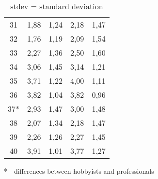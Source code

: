 \begin{table}
\begin{tabular}{c|c c|c c}
        31 & 1,88& 1,24 & 2,18 & 1,47\\
        32 & 1,76& 1,19 & 2,09 & 1,54\\ 
        33 & 2,27& 1,36 & 2,50 & 1,60\\
        34 & 3,06& 1,45 & 3,14 & 1,21\\
        35 & 3,71& 1,22 & 4,00 & 1,11\\
        36 & 3,82& 1,04 & 3,82 & 0,96\\
        37* & 2,93& 1,47 & 3,00 & 1,48\\
        38 & 2,07& 1,34 & 2,18 & 1,47\\
        39 & 2,26& 1,26 & 2,27 & 1,45\\
        40 & 3,91& 1,01 & 3,77 & 1,27
    \end{tabular}
    \caption*{* - differences between hobbyists and professionals}
    \caption*{stdev = standard deviation}
    \label{tab:avgResult}
\end{table}